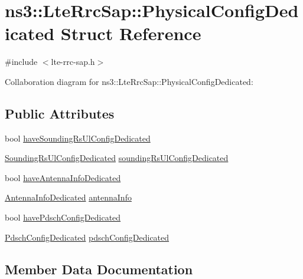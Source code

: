 \hypertarget{structns3_1_1LteRrcSap_1_1PhysicalConfigDedicated}{}\section{ns3\+:\+:Lte\+Rrc\+Sap\+:\+:Physical\+Config\+Dedicated Struct Reference}
\label{structns3_1_1LteRrcSap_1_1PhysicalConfigDedicated}


{\ttfamily \#include $<$lte-\/rrc-\/sap.\+h$>$}



Collaboration diagram for ns3\+:\+:Lte\+Rrc\+Sap\+:\+:Physical\+Config\+Dedicated\+:
\subsection*{Public Attributes}
\begin{DoxyCompactItemize}
\item 
bool \hyperlink{structns3_1_1LteRrcSap_1_1PhysicalConfigDedicated_ad21dfb2d8802b28f792b889b68c47761}{have\+Sounding\+Rs\+Ul\+Config\+Dedicated}
\item 
\hyperlink{structns3_1_1LteRrcSap_1_1SoundingRsUlConfigDedicated}{Sounding\+Rs\+Ul\+Config\+Dedicated} \hyperlink{structns3_1_1LteRrcSap_1_1PhysicalConfigDedicated_ab37d726f290ebc8cd81e8d4f68939fdc}{sounding\+Rs\+Ul\+Config\+Dedicated}
\item 
bool \hyperlink{structns3_1_1LteRrcSap_1_1PhysicalConfigDedicated_a9812528d9bedddf8ff7a6c63dbc8e624}{have\+Antenna\+Info\+Dedicated}
\item 
\hyperlink{structns3_1_1LteRrcSap_1_1AntennaInfoDedicated}{Antenna\+Info\+Dedicated} \hyperlink{structns3_1_1LteRrcSap_1_1PhysicalConfigDedicated_ae7fc9e40e971e9bdaf9f06e3a0ca9a56}{antenna\+Info}
\item 
bool \hyperlink{structns3_1_1LteRrcSap_1_1PhysicalConfigDedicated_adaba36198a0e653cf1536cab2833f119}{have\+Pdsch\+Config\+Dedicated}
\item 
\hyperlink{structns3_1_1LteRrcSap_1_1PdschConfigDedicated}{Pdsch\+Config\+Dedicated} \hyperlink{structns3_1_1LteRrcSap_1_1PhysicalConfigDedicated_a17e35740747a19ce9aebf834f50c2f4b}{pdsch\+Config\+Dedicated}
\end{DoxyCompactItemize}


\subsection{Member Data Documentation}
